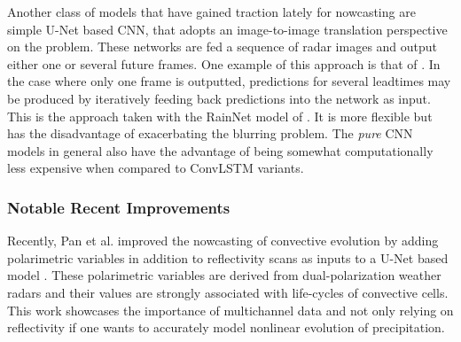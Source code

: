 Another class of models that have gained traction lately for nowcasting are simple U-Net based CNN, that adopts an image-to-image translation perspective on the problem. These networks are fed a sequence of radar images and output either one or several future frames. One example of this approach is  that of \citet{agrawal_machine_2019}. In the case where only one frame is outputted, predictions for several leadtimes may be produced by iteratively feeding back predictions into the network as input. This is the approach taken with the RainNet model of \citet{ayzel_rainnet_nodate}. It is more flexible but has the disadvantage of exacerbating the blurring problem. The \textit{pure} CNN models in general also have the advantage of being somewhat computationally less expensive when compared to ConvLSTM variants. 

\subsubsection*{Notable Recent Improvements}

Recently, Pan et al. improved the nowcasting of convective evolution by adding  polarimetric variables in addition to reflectivity scans as inputs to a U-Net based model \cite{pan_improving_2021}. These polarimetric variables are derived from dual-polarization weather radars and their values are strongly associated with life-cycles of convective cells. This work showcases the importance of multichannel data and not only relying on reflectivity if one wants to accurately model nonlinear evolution of precipitation.

